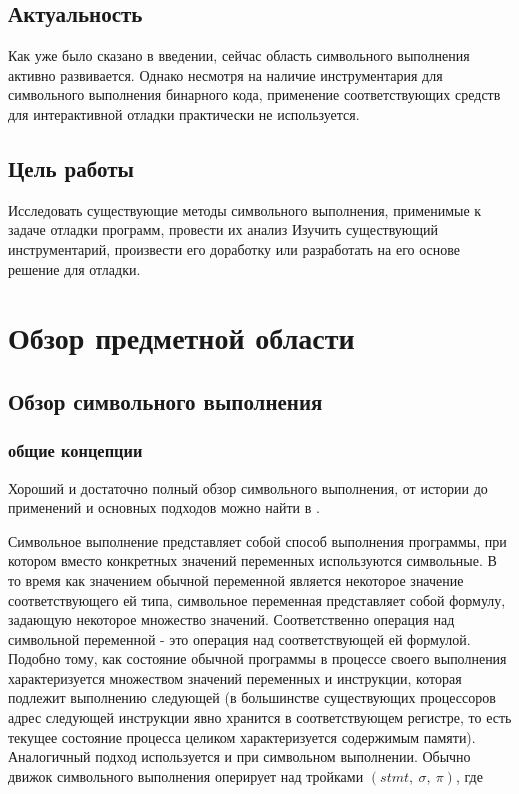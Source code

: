 \subsection{Актуальность}

Как уже было сказано в введении, сейчас область символьного выполнения активно развивается.
Однако несмотря на наличие инструментария для символьного выполнения бинарного кода, применение соответствующих средств для интерактивной отладки практически не используется.

\subsection{Цель работы}

Исследовать существующие методы символьного выполнения, применимые к задаче отладки программ, провести их анализ
Изучить существующий инструментарий, произвести его доработку или разработать на его основе решение для отладки.

\section{Обзор предметной области}

\subsection{Обзор символьного выполнения}

\subsubsection{общие концепции}

Хороший и достаточно полный обзор символьного выполнения, от истории до применений и основных подходов можно найти в \cite{SurveySymExec-CSUR18}.

Символьное выполнение представляет собой способ выполнения программы, при котором вместо конкретных значений переменных используются символьные. В то время как значением обычной переменной является некоторое значение соответствующего ей типа, символьное переменная представляет собой формулу, задающую некоторое множество значений.
Соответственно операция над символьной переменной - это операция над соответствующей ей формулой.
\bigskip
Подобно тому, как состояние обычной программы в процессе своего выполнения характеризуется множеством значений переменных и инструкции, которая подлежит выполнению следующей (в большинстве существующих процессоров адрес следующей инструкции явно хранится в соответствующем регистре, то есть текущее состояние процесса целиком характеризуется содержимым памяти).
Аналогичный подход используется и при символьном выполнении.
Обычно движок символьного выполнения оперирует над тройками $(stmt,~\sigma,~\pi)$, где

